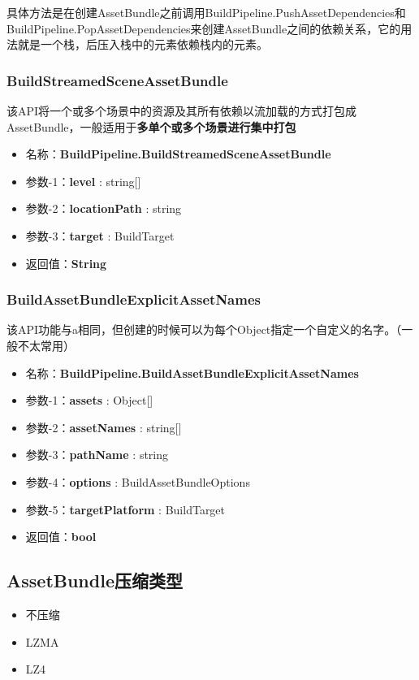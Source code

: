\documentclass[UTF8,a4paper,12pt]{ctexbook}
\begin{document}
					具体方法是在创建AssetBundle之前调用BuildPipeline.PushAssetDependencies和BuildPipeline.PopAssetDependencies来创建AssetBundle之间的依赖关系，它的用法就是一个栈，后压入栈中的元素依赖栈内的元素。
				
			\subsubsection{BuildStreamedSceneAssetBundle}
				该API将一个或多个场景中的资源及其所有依赖以流加载的方式打包成AssetBundle，一般适用于\textbf{多单个或多个场景进行集中打包}
				
				\begin{itemize}
					\item 名称：\textbf{BuildPipeline.BuildStreamedSceneAssetBundle}
					\item 参数-1：\textbf{level} : string[]
					\item 参数-2：\textbf{locationPath} : string
					\item 参数-3：\textbf{target} : BuildTarget
					\item 返回值：\textbf{String}
				\end{itemize}
	
				
				
			\subsubsection{BuildAssetBundleExplicitAssetNames}
				该API功能与a相同，但创建的时候可以为每个Object指定一个自定义的名字。（一般不太常用）
				
				\begin{itemize}
					\item 名称：\textbf{BuildPipeline.BuildAssetBundleExplicitAssetNames}
					\item 参数-1：\textbf{assets} : Object[]
					\item 参数-2：\textbf{assetNames} : string[]
					\item 参数-3：\textbf{pathName} : string
					\item 参数-4：\textbf{options} : BuildAssetBundleOptions
					\item 参数-5：\textbf{targetPlatform} : BuildTarget
					\item 返回值：\textbf{bool}
				\end{itemize}			
		
		\subsection{AssetBundle压缩类型}
			\begin{itemize}
				\item 不压缩
				\item LZMA
				\item LZ4
			\end{itemize}	
			
\end{document}
